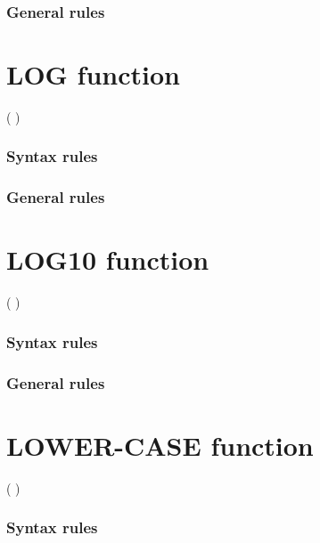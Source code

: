 \subsubsection{General rules}

\section{LOG function}

\begin{syntax}
    ( \argument )
\end{syntax}

\subsubsection{Syntax rules}

\subsubsection{General rules}

\section{LOG10 function}

\begin{syntax}
    ( \argument )
\end{syntax}

\subsubsection{Syntax rules}

\subsubsection{General rules}

\section{LOWER-CASE function}

\begin{syntax}
    ( \argument )
\end{syntax}

\subsubsection{Syntax rules}

